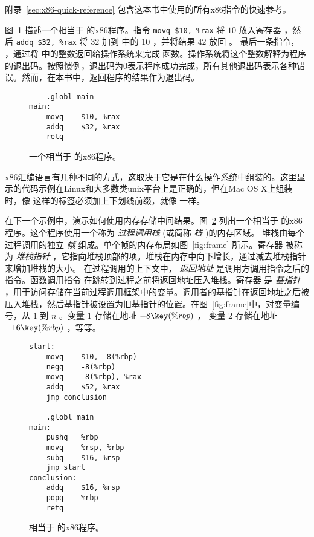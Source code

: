 \documentclass[11pt]{book}
\begin{document}
附录~\ref{sec:x86-quick-reference} 包含这本书中使用的所有x86指令的快速参考。

图~\ref{fig:p0-x86} 描述一个相当于
 的x86程序。指令 \lstinline{movq $10, %rax}
将 $10$ 放入寄存器  ，然后 \lstinline{addq $32, %rax}
将 $32$ 加到  中的 $10$ ，并将结果 $42$ 放回  。
%
最后一条指令，  ，通过将  中的整数返回给操作系统来完成  函数。操作系统将这个整数解释为程序的退出码。按照惯例，退出码为0表示程序成功完成，所有其他退出码表示各种错误。然而，在本书中，返回程序的结果作为退出码。

\begin{figure}[tbp]
\begin{lstlisting}
	.globl main
main:
	movq	$10, %rax
	addq	$32, %rax
	retq
\end{lstlisting}
\caption{一个相当于  的x86程序。}
\label{fig:p0-x86}
\end{figure}

x86汇编语言有几种不同的方式，这取决于它是在什么操作系统中组装的。这里显示的代码示例在Linux和大多数类unix平台上是正确的，但在Mac OS X上组装时，像  这样的标签必须加上下划线前缀，就像  一样。

在下一个示例中，演示如何使用内存存储中间结果。图~\ref{fig:p1-x86} 列出一个相当于  的x86程序。这个程序使用一个称为 \emph{过程调用栈} (或简称 \emph{栈} )的内存区域。  堆栈由每个过程调用的独立 \emph{帧} 组成。单个帧的内存布局如图~\ref{fig:frame} 所示。寄存器  被称为
\emph{堆栈指针} ，它指向堆栈顶部的项。堆栈在内存中向下增长，通过减去堆栈指针来增加堆栈的大小。
在过程调用的上下文中， \emph{返回地址} 是调用方调用指令之后的指令。函数调用指令
 在跳转到过程之前将返回地址压入堆栈。寄存器  是 \emph{基指针} ，用于访问存储在当前过程调用框架中的变量。调用者的基指针在返回地址之后被压入堆栈，然后基指针被设置为旧基指针的位置。在图~\ref{fig:frame}中，对变量编号，从 $1$ 到 $n$ 。变量 $1$ 存储在地址 $-8\key{(\%rbp)}$ ，
变量 $2$ 存储在地址 $-16\key{(\%rbp)}$ ，等等。

\begin{figure}[tbp]
\begin{lstlisting}
start:
	movq	$10, -8(%rbp)
	negq	-8(%rbp)
	movq	-8(%rbp), %rax
	addq	$52, %rax
	jmp conclusion

	.globl main
main:
	pushq	%rbp
	movq	%rsp, %rbp
	subq	$16, %rsp
	jmp start
conclusion:
	addq	$16, %rsp
	popq	%rbp
	retq
\end{lstlisting}
\caption{相当于  的x86程序。}
\label{fig:p1-x86}
\end{figure}
\end{document}
